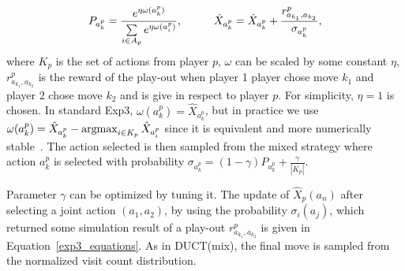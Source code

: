 \documentclass{article}
\newcommand{\argmax}{\operatornamewithlimits{argmax}}
\begin{document}
\begin{equation}\label{exp3_equations}
P_{a^{p}_{k}}=\frac{e^{\eta\omega(a^{p}_{k})}}{\sum\limits_{i \in A_{p}}e^{\eta\omega(a^{p}_{i})}}, 
\mbox{\hspace{1cm}}
\hat{X}_{a^{p}_{k}} = \hat{X}_{a^{p}_{k}} + \frac{r^{p}_{a_{k_{1}},a_{k_{2}}}}{\sigma_{a^{p}_{k}}},
\end{equation}
where $K_{p}$ is the set of actions from player $p$, $\omega$ can be scaled by some constant $\eta$, $r^{p}_{a_{k_{1}},a_{k_{2}}}$ is the reward of the play-out when player 1 player chose move $k_{1}$ and player 2 chose move $k_{2}$ and is give in respect to player $p$.
For simplicity, $\eta=1$ is chosen. 
In standard Exp3, $\omega(a^p_k) = \hat{X}_{a^p_k}$, but in practice we use $\omega(a^{p}_{k} ) = \hat{X}_{a^{p}_{k}} - \argmax_{i \in K_{p}}\hat{X}_{a^{p}_{i}}$ since it is equivalent and more numerically stable~\cite{mcts_goofspiel}.
The action selected is then sampled from the mixed strategy where action $a^p_k$ is selected with probability $\sigma_{a^{p}_{k}}=(1-\gamma)  P_{a^{p}_{k}} + \frac{\gamma}{|K_{p}|}$.




Parameter $\gamma$ can be optimized by tuning it. The update of $\hat{X}_{p}(a_{n})$ after selecting a joint action $(a_{1},a_{2})$, by using the probability $\sigma_{i}(a_{j})$, which returned some simulation result of a play-out $r^{p}_{a_{k_{1}},a_{k_{2}}}$ is given in Equation~\ref{exp3_equations}.
As in DUCT(mix), the final move is sampled from the normalized visit count distribution.
\end{document}
